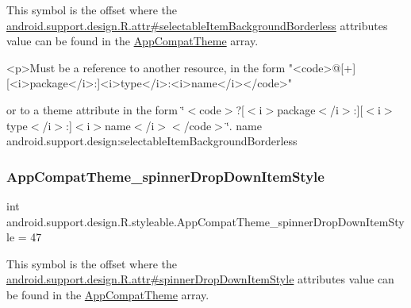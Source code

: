 This symbol is the offset where the \hyperlink{classandroid_1_1support_1_1design_1_1R_1_1attr_ab7ce9e711117ab9af03c5d753d9124dc}{android.\+support.\+design.\+R.\+attr\#selectable\+Item\+Background\+Borderless} attribute\textquotesingle{}s value can be found in the \hyperlink{classandroid_1_1support_1_1design_1_1R_1_1styleable_afb351dc8de20cbd4c89abe360373010c}{App\+Compat\+Theme} array.

\begin{DoxyVerb}      <p>Must be a reference to another resource, in the form "<code>@[+][<i>package</i>:]<i>type</i>:<i>name</i></code>"
\end{DoxyVerb}
 or to a theme attribute in the form \char`\"{}$<$code$>$?\mbox{[}$<$i$>$package$<$/i$>$\+:\mbox{]}\mbox{[}$<$i$>$type$<$/i$>$\+:\mbox{]}$<$i$>$name$<$/i$>$$<$/code$>$\char`\"{}.  name android.\+support.\+design\+:selectable\+Item\+Background\+Borderless \mbox{\label{classandroid_1_1support_1_1design_1_1R_1_1styleable_a762707a1c6a6aa1a8ef4921392a1718d}} 
\subsubsection{\texorpdfstring{App\+Compat\+Theme\+\_\+spinner\+Drop\+Down\+Item\+Style}{AppCompatTheme\_spinnerDropDownItemStyle}}
{\footnotesize\ttfamily int android.\+support.\+design.\+R.\+styleable.\+App\+Compat\+Theme\+\_\+spinner\+Drop\+Down\+Item\+Style = 47\hspace{0.3cm}{\ttfamily [static]}}

This symbol is the offset where the \hyperlink{classandroid_1_1support_1_1design_1_1R_1_1attr_afbb73b15113fa7eb3cad3845486711fb}{android.\+support.\+design.\+R.\+attr\#spinner\+Drop\+Down\+Item\+Style} attribute\textquotesingle{}s value can be found in the \hyperlink{classandroid_1_1support_1_1design_1_1R_1_1styleable_afb351dc8de20cbd4c89abe360373010c}{App\+Compat\+Theme} array.

